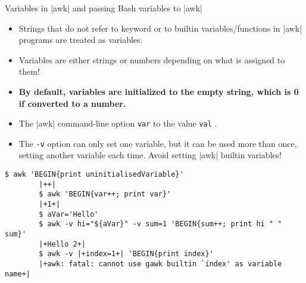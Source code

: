 \begin{frame}[fragile]{Variables in \bash|awk| and passing Bash variables to \bash|awk|}
    \vspace{-3mm}
    \begin{itemize}
        \item Strings that do not refer to keyword or to builtin variables/functions in \bash|awk| programs are treated as variables.
        \item \alert{Variables are either strings or numbers depending on what is assigned to them!}
        \item \textbf{By default, variables are initialized to the empty string, which is 0 if converted to a number.}
        \item The \bash|awk| command-line option \; \texttt{var} to the value \texttt{val} .
        \item The \texttt{-v} option can only set one variable, but it can be used more than once, setting another variable each time.
              \alert{Avoid setting \bash|awk| builtin variables!}
    \end{itemize}
    \begin{lstlisting}[style=MyBash, aboveskip=2mm, xleftmargin=2mm, xrightmargin=2mm]
        $ awk 'BEGIN{print uninitialisedVariable}'
        |++|
        $ awk 'BEGIN{var++; print var}'
        |+1+|
        $ aVar='Hello'
        $ awk -v hi="${aVar}" -v sum=1 'BEGIN{sum++; print hi " " sum}'
        |+Hello 2+|
        $ awk -v |+index=1+| 'BEGIN{print index}'
        |+awk: fatal: cannot use gawk builtin `index' as variable name+|
    \end{lstlisting}
    \PrepareURLsymbol[PB]
\end{frame}

